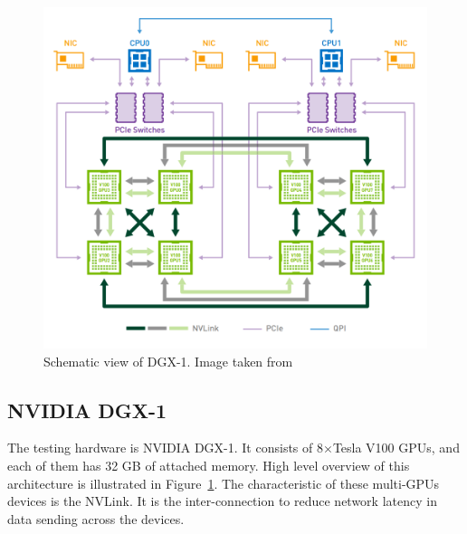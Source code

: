 \begin{figure}[htbp]
  \centering
  \includegraphics[width=0.6\linewidth]{fig/dgx-arch.png}
  \caption{Schematic view of DGX-1. Image taken from \cite{dgx-1}}
  \label{fig:dgx}
\end{figure}



\subsection{NVIDIA DGX-1}

The testing hardware is NVIDIA DGX-1. It consists of 8$\times$Tesla V100 GPUs, and each of them has 32 GB of attached memory. High level overview of this architecture is illustrated in Figure~\ref{fig:dgx}. The characteristic of these multi-GPUs devices is the NVLink. It is the inter-connection to reduce network latency in data sending across the devices. \cite{dgx-1}
